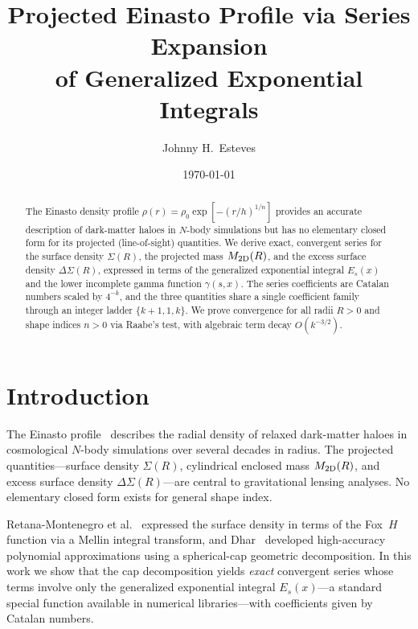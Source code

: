 \documentclass{article}
\title{Projected Einasto Profile via Series Expansion\\
of Generalized Exponential Integrals}
\author{Johnny H.~Esteves}
\date{\today}
\begin{document}
\maketitle

\begin{abstract}
The Einasto density profile $\rho(r)=\rho_0\exp[-(r/h)^{1/n}]$ provides an
accurate description of dark-matter haloes in $N$-body simulations but has no
elementary closed form for its projected (line-of-sight) quantities.  We derive
exact, convergent series for the surface density $\Sigma(R)$, the projected
mass $M_{\rm 2D}(R)$, and the excess surface density $\Delta\Sigma(R)$,
expressed in terms of the generalized exponential integral $E_s(x)$ and the
lower incomplete gamma function $\gamma(s,x)$.  The series coefficients are
Catalan numbers scaled by $4^{-k}$, and the three quantities share a single
coefficient family through an integer ladder $\{k+1,1,k\}$.  We prove
convergence for all radii $R>0$ and shape indices $n>0$ via Raabe's test, with
algebraic term decay $O(k^{-3/2})$.
\end{abstract}

\section{Introduction}
\label{sec:intro}

The Einasto profile~\cite{Einasto1965,Navarro2004,Merritt2006} describes the
radial density of relaxed dark-matter haloes in cosmological $N$-body
simulations over several decades in radius.  The projected quantities---surface
density $\Sigma(R)$, cylindrical enclosed mass $M_{\rm 2D}(R)$, and excess
surface density $\Delta\Sigma(R)$---are central to gravitational lensing
analyses.  No elementary closed form exists for general shape index.

Retana-Montenegro et al.~\cite{RetanaMontenegro2012} expressed the surface
density in terms of the Fox~$H$ function via a Mellin integral transform, and
Dhar~\cite{Dhar2021} developed high-accuracy polynomial approximations using a
spherical-cap geometric decomposition.  In this work we show that the cap
decomposition yields \emph{exact} convergent series whose terms involve only
the generalized exponential integral $E_s(x)$---a standard special function
available in numerical libraries---with coefficients given by Catalan numbers.
\end{document}
